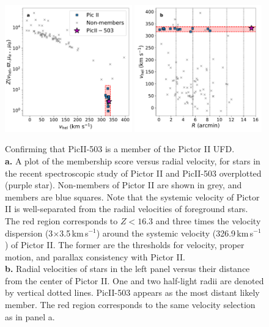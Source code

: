 \documentclass[pdflatex,sn-nature]{sn-jnl}%
\theoremstyle{thmstyleone}%
\theoremstyle{thmstyletwo}%
\theoremstyle{thmstylethree}%
\begin{document}
\begin{figure}[h]
\centering
\includegraphics[width=0.49\textwidth]{memscore.pdf}
\includegraphics[width=0.49\textwidth]{rv_dist.pdf}
\caption{Confirming that PicII-503 is a member of the Pictor II UFD.\\
\textbf{a.} A plot of the membership score versus radial velocity, for stars in the recent spectroscopic study of Pictor II\cite{pace+25} and PicII-503 overplotted (purple star). 
Non-members of Pictor II are shown in grey, and members are blue squares. 
Note that the systemic velocity of Pictor II is well-separated from the radial velocities of foreground stars.
The red region corresponds to $Z < 16.3$ and three times the velocity dispersion (3$\times$3.5\,km\,s$^{-1}$) around the systemic velocity (326.9\,km\,s$^{-1}$) of Pictor II\cite{pace+25}.
The former are the thresholds for velocity, proper motion, and parallax consistency with Pictor II.\\
\textbf{b.} Radial velocities of stars in the left panel versus their distance from the center of Pictor II.
One and two half-light radii are denoted by vertical dotted lines.
PicII-503 appears as the most distant likely member.
The red region corresponds to the same velocity selection as in panel a.
}
\label{fig:membership}
\end{figure}
\end{document}
